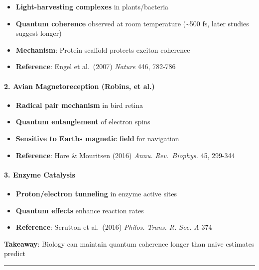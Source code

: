 \begin{itemize}
\tightlist
\item
  \textbf{Light-harvesting complexes} in plants/bacteria
\item
  \textbf{Quantum coherence} observed at room temperature
  (\textasciitilde500 fs, later studies suggest longer)
\item
  \textbf{Mechanism}: Protein scaffold protects exciton coherence
\item
  \textbf{Reference}: Engel et al.~(2007) \emph{Nature} 446, 782-786
\end{itemize}

\paragraph{2. Avian Magnetoreception (Robins, et
al.)}\label{avian-magnetoreception-robins-et-al.}

\begin{itemize}
\tightlist
\item
  \textbf{Radical pair mechanism} in bird retina
\item
  \textbf{Quantum entanglement} of electron spins
\item
  \textbf{Sensitive to Earth\textquotesingle s magnetic field} for
  navigation
\item
  \textbf{Reference}: Hore \& Mouritsen (2016) \emph{Annu.
  Rev.~Biophys.} 45, 299-344
\end{itemize}

\paragraph{3. Enzyme Catalysis}\label{enzyme-catalysis}

\begin{itemize}
\tightlist
\item
  \textbf{Proton/electron tunneling} in enzyme active sites
\item
  \textbf{Quantum effects} enhance reaction rates
\item
  \textbf{Reference}: Scrutton et al.~(2016) \emph{Philos. Trans. R.
  Soc. A} 374
\end{itemize}

\textbf{Takeaway}: Biology can maintain quantum coherence longer than
naive estimates predict

\begin{center}\rule{0.5\linewidth}{0.5pt}\end{center}

